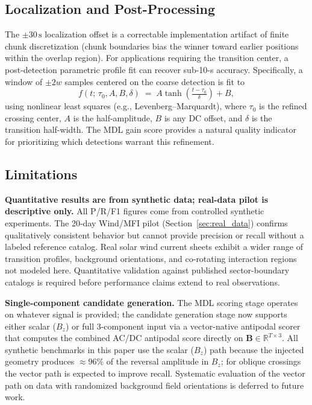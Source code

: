 \documentclass[12pt,letterpaper]{article}
\newcommand{\secunit}{\,\mathrm{s}}
\begin{document}
\subsection{Localization and Post-Processing}

The $\pm 30\secunit$ localization offset is a correctable implementation
artifact of finite chunk discretization (chunk boundaries bias the winner
toward earlier positions within the overlap region).
For applications requiring the transition center, a post-detection
parametric profile fit can recover sub-10-s accuracy.
Specifically, a window of $\pm 2w$ samples centered on the coarse detection
is fit to
\begin{equation}
  f(t;\,\tau_0,A,B,\delta) \;=\; A\tanh\!\left(\tfrac{t-\tau_0}{\delta}\right) + B,
  \label{eq:tanh_fit}
\end{equation}
using nonlinear least squares (e.g., Levenberg--Marquardt), where $\tau_0$ is
the refined crossing center, $A$ is the half-amplitude, $B$ is any DC offset,
and $\delta$ is the transition half-width.
The MDL gain score provides a natural quality indicator for prioritizing
which detections warrant this refinement.

\subsection{Limitations}
\label{subsec:limits}

\textbf{Quantitative results are from synthetic data; real-data pilot is
descriptive only.}
All P/R/F1 figures come from controlled synthetic experiments.
The 20-day Wind/MFI pilot (Section~\ref{sec:real_data}) confirms qualitatively
consistent behavior but cannot provide precision or recall without a labeled
reference catalog.
Real solar wind current sheets exhibit a wider range of transition profiles,
background orientations, and co-rotating interaction regions not modeled here.
Quantitative validation against published sector-boundary catalogs is required
before performance claims extend to real observations.

\textbf{Single-component candidate generation.}
The MDL scoring stage operates on whatever signal is provided; the candidate
generation stage now supports either scalar ($B_z$) or full 3-component
input via a vector-native antipodal scorer that computes the combined
AC/DC antipodal score directly on $\mathbf{B} \in \mathbb{R}^{T \times 3}$.
All synthetic benchmarks in this paper use the scalar ($B_z$) path because
the injected geometry produces $\approx 96\%$ of the reversal amplitude in
$B_z$; for oblique crossings the vector path is expected to improve recall.
Systematic evaluation of the vector path on data with randomized background
field orientations is deferred to future work.
\end{document}
